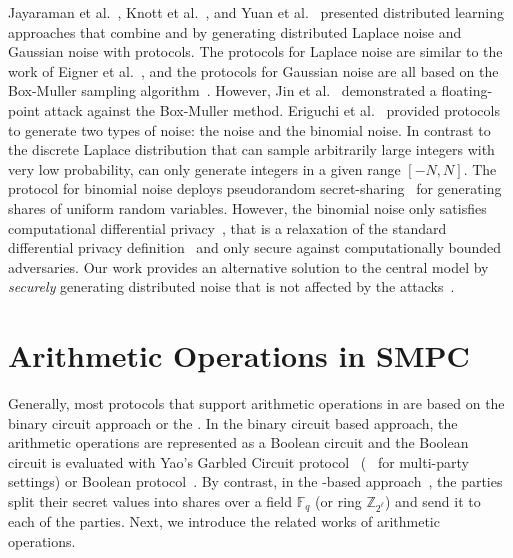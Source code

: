 Jayaraman et al.~\cite{jayaraman2018distributed}, Knott et al.~\cite{knott2021crypten}, and Yuan et al.~\cite{yuan2021practical} presented distributed learning approaches that combine \smpc and \differentialprivacy by generating distributed Laplace noise and Gaussian noise with \smpc protocols. The protocols for Laplace noise are similar to the work of Eigner et al.~\cite{eigner2014differentially}, and the protocols for Gaussian noise are all based on the Box-Muller sampling algorithm~\cite{box1958note}. However, Jin et al.~\cite{jin2022we} demonstrated a floating-point attack against the Box-Muller method.
Eriguchi et al.~\cite{eriguchi2021efficient} provided \smpc protocols to generate two types of noise: the \fdl noise and the binomial noise. In contrast to the discrete Laplace distribution that can sample arbitrarily large integers with very low probability, \fdl can only generate integers in a given range $\left[-N,N\right] $. The protocol for binomial noise deploys pseudorandom secret-sharing~\cite{cramer2005share} for generating shares of uniform random variables. However, the binomial noise only satisfies computational differential privacy~\cite{mironov2009computational}, that is a relaxation of the standard differential privacy definition~\cite{dwork2014algorithmic} and only secure against computationally bounded adversaries.
Our work provides an alternative solution to the central \differentialprivacy model by \textit{securely} generating distributed noise that is not affected by the attacks~\cite{mironov2012significance,jin2022we}.


\section{Arithmetic Operations in SMPC}
\label{ArithmeticOperationsinSMPC}

Generally, most \smpc protocols that support arithmetic operations in \smpc are based on the binary circuit approach or the \lsss. In the binary circuit based approach, the arithmetic operations are represented as a Boolean circuit and the Boolean circuit is evaluated with Yao's Garbled Circuit protocol~\cite{yao1986generate} (\bmr~\cite{beaver1990round} for multi-party settings) or Boolean \gmw protocol~\cite{goldreich1987play}.
By contrast, in the \lsss-based approach~\cite{chaum1988multiparty,ben1988completeness}, the parties split their secret values into shares over a field $\mathbb{F} _q$ (or ring $\mathbb{Z} _{2^{\ell}}$) and send it to each of the parties. Next, we introduce the related works of arithmetic operations.

